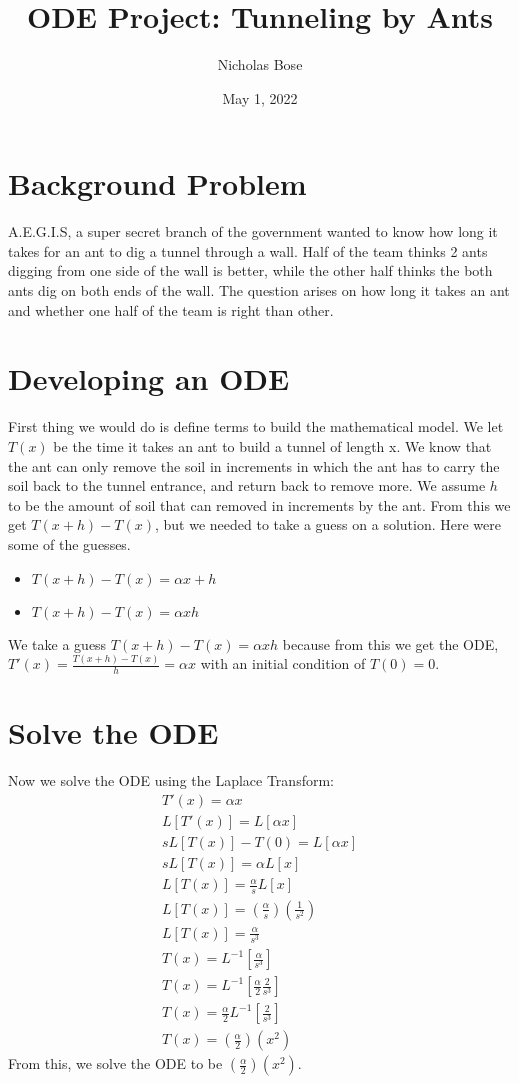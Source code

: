 \documentclass{article}
\title{ODE Project: Tunneling by Ants}
\author{Nicholas Bose }
\date{May 1, 2022}
\begin{document}
\maketitle

\section{Background Problem}
A.E.G.I.S, a super secret branch of the government wanted to know how long it takes for an ant to dig a tunnel through a wall. Half of the team thinks 2 ants digging from one side of the wall is better, while the other half thinks the both ants dig on both ends of the wall. The question arises on how long it takes an ant and whether one half of the team is right than other. 
\section{Developing an ODE}
First thing we would do is define terms to build the mathematical model. We let $T(x)$ be the time it takes an ant to build a tunnel of length x. We know that the ant can only remove the soil in increments in which the ant has to carry the soil back to the tunnel entrance, and return back to remove more. We assume $h$ to be the amount of soil that can removed in increments by the ant. From this we get $T(x+h) - T(x)$, but we needed to take a guess on a solution. Here were some of the guesses.
\begin{itemize}
    \item $T(x+h) - T(x) = \alpha x + h$
    \item $T(x+h) - T(x) = \alpha xh $
\end{itemize}
We take a guess $T(x+h) - T(x) = \alpha xh$ because from this we get the ODE, $T'(x) = \frac{T(x+h) - T(x)}{h} = \alpha x$ with an initial condition of $T(0) = 0$. 

\section{Solve the ODE}
Now we solve the ODE using the Laplace Transform:
\begin{align*}
    T'(x) = \alpha x \\
    L[T'(x)] = L[\alpha x] \\
    sL[T(x)] - T(0) = L[\alpha x] \\
    sL[T(x)] = \alpha L[x] \\
    L[T(x)] = \frac{\alpha}{s} L[x] \\
    L[T(x)] = (\frac{\alpha}{s})(\frac{1}{s^{2}}) \\
    L[T(x)] = \frac{\alpha}{s^{3}} \\
    T(x) = L^{-1}[\frac{\alpha}{s^{3}}] \\
    T(x) = L^{-1}[\frac{\alpha}{2} \frac{2}{s^{3}}] \\
    T(x) = \frac{\alpha}{2} L^{-1}[\frac{2}{s^{3}}] \\
    T(x) = (\frac{\alpha}{2})(x^{2})
\end{align*}
From this, we solve the ODE to be $(\frac{\alpha}{2})(x^{2})$.
\end{document}
